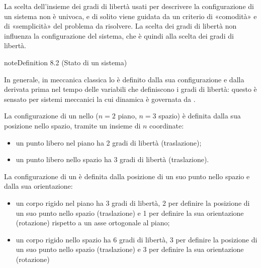 \documentclass[letterpaper,10pt,italian]{jupyterBook}
\begin{document}
\sphinxAtStartPar
La scelta dell’insieme dei gradi di libertà usati per descrivere la configurazione di un sistema non è univoca, e di solito viene guidata da un criterio di «comodità» e di «semplicità» del problema da risolvere. La scelta dei gradi di libertà non influenza la configurazione del sistema, che è quindi  alla scelta dei gradi di libertà.
\label{ch/mechanics/kinematics:system-state}
\begin{sphinxadmonition}{note}{Definition 8.2 (Stato di un sistema)}



\sphinxAtStartPar
In generale, in meccanica classica lo  è definito dalla sua configurazione e dalla derivata prima nel tempo delle variabili che definiscono i gradi di libertà: questo è sensato per sistemi meccanici la cui dinamica è governata da .
\end{sphinxadmonition}

\sphinxAtStartPar
La configurazione di un  nello  (\(n=2\) piano, \(n=3\) spazio) è definita dalla sua posizione nello spazio, tramite un insieme di \(n\) coordinate:
\begin{itemize}
\item {} 
\sphinxAtStartPar
un punto libero nel piano ha 2 gradi di libertà (traslazione);

\item {} 
\sphinxAtStartPar
un punto libero nello spazio ha 3 gradi di libertà (traslazione).

\end{itemize}

\sphinxAtStartPar
La configurazione di un  è definita dalla posizione di un suo punto nello spazio e dalla sua orientazione:
\begin{itemize}
\item {} 
\sphinxAtStartPar
un corpo rigido nel piano ha 3 gradi di libertà, 2 per definire la posizione di un suo punto nello spazio (traslazione) e 1 per definire la sua orientazione (rotazione) rispetto a un asse ortogonale al piano;

\item {} 
\sphinxAtStartPar
un corpo rigido nello spazio ha 6 gradi di libertà, 3 per definire la posizione di un suo punto nello spazio (traslazione) e 3 per definire la sua orientazione (rotazione)

\end{itemize}
\end{document}
